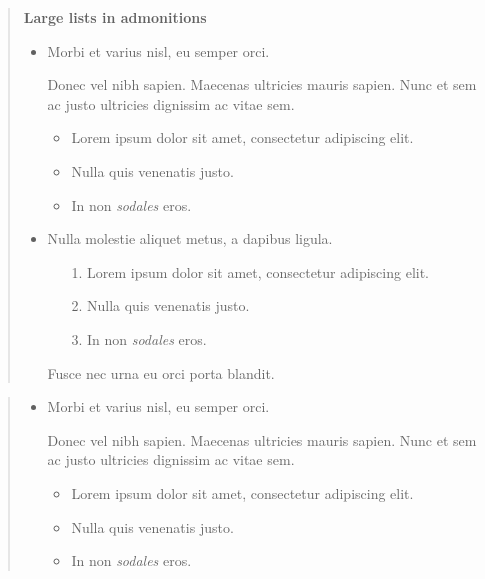 \begin{quote}
\textbf{Large lists in admonitions}

\begin{itemize}
\item Morbi et varius nisl, eu semper orci.

Donec vel nibh sapien. Maecenas ultricies mauris sapien. Nunc et sem ac justo ultricies dignissim ac vitae sem.

\begin{itemize}
\item Lorem ipsum dolor sit amet, consectetur adipiscing elit.


\item Nulla quis venenatis justo.


\item In non \emph{sodales} eros.

\end{itemize}

\item Nulla molestie aliquet metus, a dapibus ligula.

\begin{itemize}
\item[1. ] Lorem ipsum dolor sit amet, consectetur adipiscing elit.


\item[2. ] Nulla quis venenatis justo.


\item[3. ] In non \emph{sodales} eros.

\end{itemize}
Fusce nec urna eu orci porta blandit.

\end{itemize}
\end{quote}


\begin{quote}
\begin{itemize}
\item Morbi et varius nisl, eu semper orci.

Donec vel nibh sapien. Maecenas ultricies mauris sapien. Nunc et sem ac justo ultricies dignissim ac vitae sem.

\begin{itemize}
\item Lorem ipsum dolor sit amet, consectetur adipiscing elit.


\item Nulla quis venenatis justo.


\item In non \emph{sodales} eros.

\end{itemize}
\end{itemize}
\end{quote}


